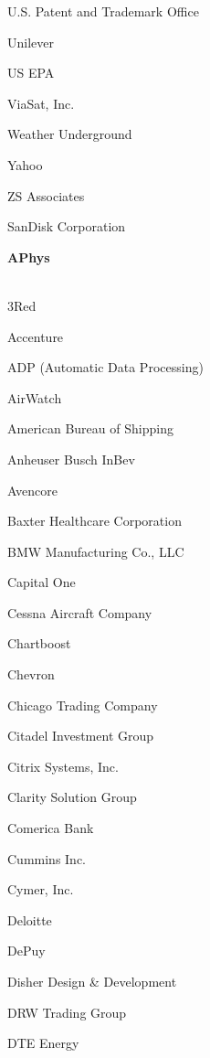 \documentclass[twoside]{article}
\begin{document}
\begin{center}
\begin{multicols}{5}
\begin{FlushLeft}
\begin{compactitem}
\item U.S. Patent and Trademark Office
\item Unilever
\item US EPA
\item ViaSat, Inc.
\item Weather Underground
\item Yahoo
\item ZS Associates
\item SanDisk Corporation
\end{compactitem}
        \end{FlushLeft}
        \vspace{1em}
        {\fontsize{14}{16}\selectfont \bf APhys}\\
        \vspace{-1em}
        ~\hrulefill~
        \vspace{-.9em}
        \begin{FlushLeft}
        \begin{compactitem}
        \item 3Red
\item Accenture
\item ADP (Automatic Data Processing)
\item AirWatch
\item American Bureau of Shipping
\item Anheuser Busch InBev
\item Avencore
\item Baxter Healthcare Corporation
\item BMW Manufacturing Co., LLC
\item Capital One
\item Cessna Aircraft Company
\item Chartboost
\item Chevron
\item Chicago Trading Company
\item Citadel Investment Group
\item Citrix Systems, Inc.
\item Clarity Solution Group
\item Comerica Bank
\item Cummins Inc.
\item Cymer, Inc.
\item Deloitte
\item DePuy
\item Disher Design \& Development
\item DRW Trading Group
\item DTE Energy

\end{compactitem}
\end{FlushLeft}
\end{multicols}
\end{center}
\end{document}
